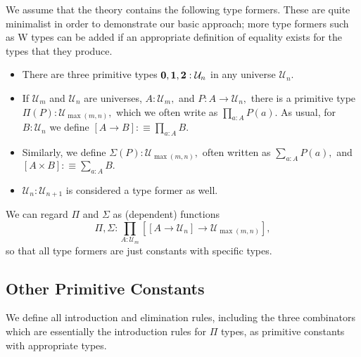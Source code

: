 \documentclass[a4paper]{article}
\theoremstyle{definition}
\theoremstyle{remark}
\let\defeq\equiv
\renewcommand{\equiv}{\simeq}
\newcommand{\univVar}{\mathcal}
\newcommand{\U}{\univVar{U}}
\newcommand{\0}{\primType{0}}
\newcommand{\1}{\primType{1}}
\newcommand{\2}{\primType{2}}
\begin{document}
We assume that the theory contains the following type formers. These are quite minimalist in
order to demonstrate our basic approach; more type formers such as W types can be added if an
appropriate definition of equality exists for the types that they produce.
\begin{itemize}
  \item There are three primitive types $\0, \1, \2 : \U_n$ in any universe $\U_n.$
  \item If $\U_m$ and $\U_n$ are universes, $A : \U_m,$ and $P : A \to \U_n,$ there is a primitive
  type $\Pi(P) : \U_{\max(m,n)},$ which we often write as $\prod_{a : A} P(a).$ As usual, for
  $B : \U_n$ we define $[A \to B] :\defeq \prod_{a : A} B.$
  \item Similarly, we define $\Sigma(P) : \U_{\max(m,n)},$ often written as $\sum_{a : A} P(a),$
  and $[A \times B] :\defeq \sum_{a : A} B.$
  \item $\U_n : \U_{n+1}$ is considered a type former as well.
\end{itemize}

We can regard $\Pi$ and $\Sigma$ as (dependent) functions
\[\Pi, \Sigma : \prod_{A : \U_m} [[A \to \U_n] \to \U_{\max(m,n)}],\]
so that all type formers are just constants with specific types.

\subsection{Other Primitive Constants}

We define all introduction and elimination rules, including the three combinators which are
essentially the introduction rules for $\Pi$ types, as primitive constants with appropriate types.
\end{document}
